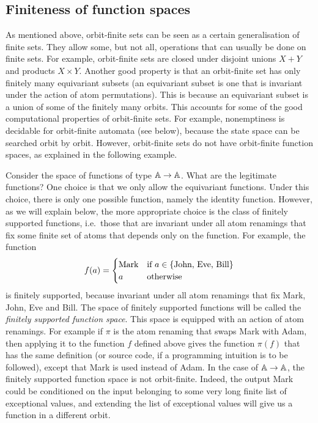 
\subsection{Finiteness of function spaces}
\label{sec:orbit-finite-function-spaces}
As mentioned above, orbit-finite sets can be seen as  a certain generalisation of finite sets. They allow some, but not all, operations that can usually be done on finite sets. For example, orbit-finite sets are closed under disjoint unions $X + Y$ and products $X \times Y$.  Another good property is that an orbit-finite set has only finitely many equivariant subsets (an equivariant subset is one that is invariant under the action of atom permutations). This is because an equivariant subset is a union of some of the finitely many orbits. This accounts for some of the good computational properties of orbit-finite sets. For example, nonemptiness is decidable for orbit-finite automata (see below), because the state space can be searched orbit by orbit.
However, orbit-finite sets do not have orbit-finite function spaces, as explained in the following example. 

\begin{example}
    Consider the space of functions of type $\mathbb A \to \mathbb A$. What are the legitimate functions? One choice is that we only allow the equivariant functions. Under this choice, there is only one possible function,  namely the identity function. However, as we will explain below, the more appropriate choice is the class of finitely supported functions, i.e.~those that are invariant under all atom renamings that fix some finite set of atoms that depends only on the function. For example,  the  function
    \begin{align*}
    f(a) = \begin{cases}
        \text{Mark} & \text{if $a \in \{\text{John, Eve, Bill}\}$} \\
        a & \text{otherwise}
    \end{cases}
    \end{align*}
    is finitely supported, because invariant under all atom renamings that fix Mark, John, Eve and Bill. The space of finitely supported functions will be called the \emph{finitely supported function space}. This space is equipped with an action of atom renamings. For example if $\pi$ is the atom renaming that swaps Mark with Adam, then applying it to the function $f$ defined above gives the function $\pi(f)$ that has the same definition (or source code, if a programming intuition is to be followed), except that Mark is used instead of Adam.
    In the case of $\mathbb A \to \mathbb A$, the finitely supported function space is not orbit-finite. Indeed, the output Mark could be conditioned on the input belonging to some very long finite list of exceptional values, and extending the list of exceptional values will give us a function in a different orbit.
\end{example}

